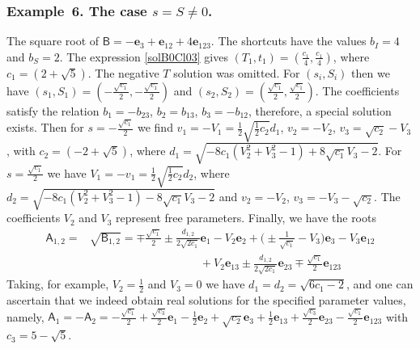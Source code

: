 \documentclass{birkjour}
\newcommand{\e}[1]{\mathbf{e}_{#1}} %
\def\A{\mathsf{A}}
\def\B{\mathsf{B}}
\def\e#1{\mathbf{e}_{#1}} %
\begin{document}
\subsubsection*{Example~6. The case $s= S\neq 0$.}
The square root of  $\B=-\e{3}+\e{12}+4\e{123}$. The shortcuts
have the values $b_I=4$ and $b_S=2$. The expression
\eqref{solB0Cl03} gives $(T_{1},t_{1})=
(\tfrac{c_1}{4},\tfrac{c_1}{4})$, where $c_1=(2+\sqrt{5})$. The
negative $T$ solution was omitted. For $(s_i, S_i)$ then we have
$(s_1,S_1)=(-\tfrac{\sqrt{c_1}}{2},-\tfrac{\sqrt{c_1}}{2})$ and
$(s_2,S_2)=(\tfrac{\sqrt{c_1}}{2},\tfrac{\sqrt{c_1}}{2})$. The
coefficients satisfy the relation $b_1 =- b_{23}$,  $b_2 =
b_{13}$,  $b_3= -b_{12}$, therefore, a special solution exists.
Then for $s=-\tfrac{\sqrt{c_1}}{2}$ we find $v_1=-V_1=\frac{1}{2}
\sqrt{\frac{1}{2} c_2} d_1$, $v_2=-V_2$, $v_3=\sqrt{c_2}-V_3$,
with $c_2=(-2+\sqrt{5})$, where $d_1=\sqrt{-8 c_1
\left(V_2^2+V_3^2-1\right)+8 \sqrt{c_1} V_3-2}$. For
$s=\tfrac{\sqrt{c_1}}{2}$ we have $V_1=-v_1=\frac{1}{2}
\sqrt{\frac{1}{2} c_2} d_2$, where $d_2=\sqrt{-8 c_1
\left(V_2^2+V_3^2-1\right)-8 \sqrt{c_1} V_3-2}$ and $v_2=-V_2$,
$v_3=-V_3-\sqrt{c_2}$. The coefficients $V_2$ and $V_3$ represent
free parameters. Finally, we have the roots 
\begin{equation}\begin{split}\label{ex2AnsCl03}
\A_{1,2}=&\sqrt{\B_{1,2}}=\mp\frac{\sqrt{c_1}}{2}\pm\frac{d_{1,2}}{2\sqrt{2 c_1}}\e{1}-V_2\e{2} + \big(\pm\frac{1}{\sqrt{c_1}}-V_3\big)\e{3} -V_3 \e{12}\\
 &\phantom{-\frac{\sqrt{c_1}}{2}+\frac{d_{1,2}}{2\sqrt{2 c_1}}\e{1}-V_2\e{2}}
+V_2\e{13}\pm\frac{d_{1,2}}{2\sqrt{2
c_1}}\e{23}\mp\frac{\sqrt{c_1}}{2}\e{123}
\end{split}\end{equation}
Taking, for example, $V_2=\frac12$ and $V_3=0$ we have
$d_1=d_2=\sqrt{6c_1-2}$, and one can ascertain that we indeed
obtain real solutions for the specified parameter values, namely,
$\A_{1}=-\A_{2}=
-\frac{\sqrt{c_1}}{2}+\frac{\sqrt{c_3}}{2}\e{1}-\frac12\e{2} +
\sqrt{c_2}\e{3} +\frac12\e{13}+
\frac{\sqrt{c_3}}{2}\e{23}-\frac{\sqrt{c_1}}{2}\e{123}$ with
$c_3=5-\sqrt{5}$.
\end{document}
